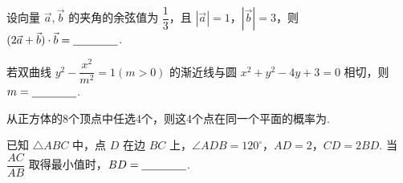 \documentclass[a4paper,11pt]{report}
\begin{document}
\begin{examquestions}[start=13]
\item 设向量 $\vec a,\vec b$ 的夹角的余弦值为 $\dfrac13$，且 $|\vec a|=1$，$|\vec b|=3$，则 $(2\vec a+\vec b)\cdot\vec b=\underline{\hspace{1.4cm}}$. 
\vspace{-0.8em}
\item 若双曲线 $y^2-\dfrac{x^2}{m^2}=1(m>0)$ 的渐近线与圆 $x^2+y^2-4y+3=0$ 相切，则 $m=\underline{\hspace{1.4cm}}$. 
\vspace{-1.5em}
\item 从正方体的8个顶点中任选4个，则这4个点在同一个平面的概率为\blank. 
\vspace{-0.4em}
\item 已知 $\triangle ABC$ 中，点 $D$ 在边 $BC$ 上，$\angle ADB=120^\circ$，$AD=2$，$CD=2BD$. 当 $\dfrac{AC}{AB}$ 取得最小值时，$BD=\underline{\hspace{1.4cm}}$. 
\end{examquestions}
\end{document}
